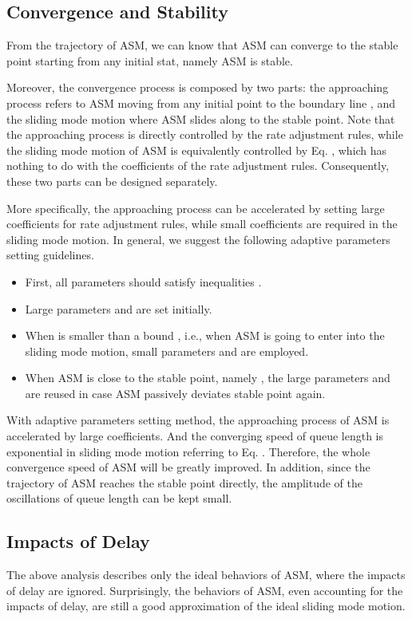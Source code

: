 \documentclass{sig-alternate-10pt}
\begin{document}
\subsection{Convergence and Stability}
From the trajectory of ASM, we can know that ASM can converge to the stable point starting from any initial stat, namely ASM is stable. 

Moreover, the convergence process is composed by two parts: the approaching process refers to ASM moving from any initial point to the boundary line , and the sliding mode motion where ASM slides along  to the stable point. Note that the approaching process is directly controlled by the rate adjustment rules, while the sliding mode motion of ASM is equivalently controlled by Eq. , which has nothing to do with the coefficients of the rate adjustment rules. Consequently, these two parts can be designed separately.

More specifically, the approaching process can be accelerated by setting large coefficients for rate adjustment rules, while small coefficients are required in the sliding mode motion. In general, we suggest the following adaptive parameters setting guidelines.
\begin{itemize}
\item First, all parameters should satisfy inequalities . 
\item Large parameters  and  are set initially.
\item When  is smaller than a bound , i.e., when ASM is going to enter into the sliding mode motion, small parameters  and  are employed.
\item When ASM is close to the stable point, namely , the large parameters  and  are reused in case ASM passively deviates stable point again.
\end{itemize}


With adaptive parameters setting method, the approaching process of ASM is accelerated by large coefficients. And the converging speed of queue length is exponential in sliding mode motion referring to Eq. . Therefore, the whole convergence speed of ASM will be greatly improved. In addition, since the trajectory of ASM reaches the stable point directly, the amplitude of the oscillations of queue length can be kept small.


\subsection{Impacts of Delay}
The above analysis describes only the ideal behaviors of ASM, where the impacts of delay are ignored. Surprisingly, the behaviors of ASM, even accounting for the impacts of delay, are still a good approximation of the ideal sliding mode motion.
\end{document}
